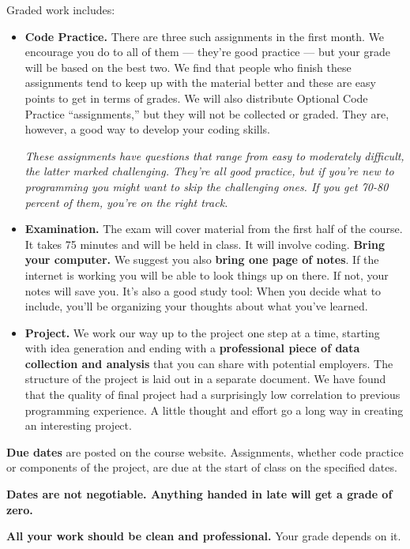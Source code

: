 Graded work includes:
%
\begin{itemize}

\item {\bf Code Practice.\/}
There are three such assignments in the first month.
We encourage you do to all of them --- they're good practice ---
but your grade will be based on the best two. We find that people who finish these assignments
tend to keep up with the material better and these are easy points to get in terms of grades.
We will also distribute Optional Code Practice ``assignments,''
but they will not be collected or graded.
They are, however, a good way to develop your coding skills.

{\it These assignments have questions that range from easy to moderately difficult,
the latter marked {\it challenging\/}.
They're all good practice, but if you're new to programming you
might want to skip the challenging ones.
If you get 70-80 percent of them, you're on the right track. \/}

\item {\bf Examination.\/}
The exam will cover material from the first half of the course.
It takes 75 minutes and will be held in class.
It will involve coding.
{\bf Bring your computer.\/}
We suggest you also {\bf bring one page of notes\/}.
If the internet is working you will be able to look things up on there.
If not, your notes will save you.
It's also a good study tool:  When you decide what to include,
you'll be organizing your thoughts about what you've learned.

\item {\bf Project.\/}
We work our way up to the project one step at a time, starting with idea generation and ending
with a {\bf professional piece of data collection and analysis\/}
that you can share with potential employers.
The structure of the project is laid out in a separate document. We have found that the quality
of final project had a surprisingly low correlation to previous programming experience. A little thought and
effort go a long way in creating an interesting project.

\end{itemize}


{\bf Due dates} are posted on the course website.
Assignments, whether code practice or components of the project,
are due at the start of class on the specified dates.

{\bf Dates are not negotiable.
Anything handed in late will get a grade of zero.\/}

{\bf All your work should be clean and professional.}  Your grade depends on it.

